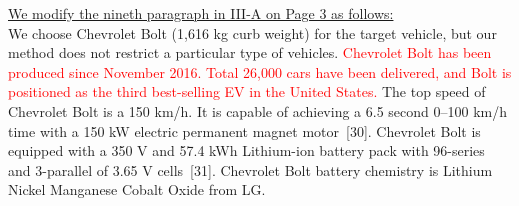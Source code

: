 \documentclass[onecolumn]{IEEEconf}
\begin{document}
\begin{description}
\uline{We modify the nineth paragraph in III-A on Page 3 as follows:}\\
We choose Chevrolet Bolt (1,616 kg curb weight) for the target vehicle, but our method does not restrict a particular type of vehicles. \textcolor{red}{Chevrolet Bolt has been produced since November 2016. Total 26,000 cars have been  delivered, and Bolt is positioned as the third best-selling EV in the United States.} The top speed of Chevrolet Bolt is a 150 km/h. It is capable of achieving a 6.5 second 0--100 km/h time with a 150 kW electric permanent magnet motor~[30]. Chevrolet Bolt is equipped with a 350 V and 57.4 kWh Lithium-ion battery pack with 96-series and 3-parallel of 3.65 V cells~[31]. Chevrolet Bolt battery chemistry is Lithium Nickel Manganese Cobalt Oxide from LG. 

\end{description}
\end{document}

